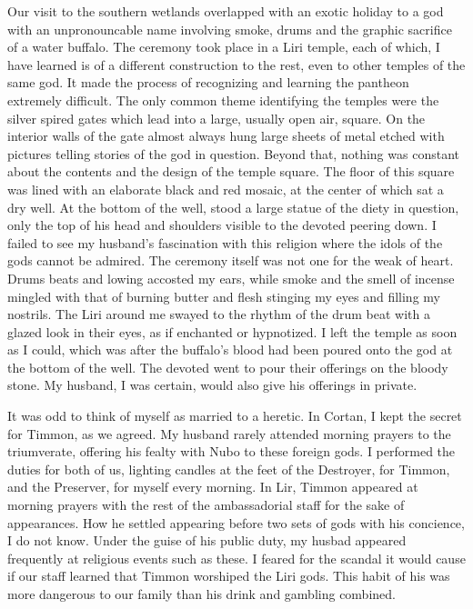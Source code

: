 \documentclass{article}
\begin{document}
Our visit to the southern wetlands overlapped with an exotic holiday to a god with an unpronouncable name involving smoke, drums and the graphic sacrifice of a water buffalo. The ceremony took place in a Liri temple, each of which, I have learned is of a different construction to the rest, even to other temples of the same god. It made the process of recognizing and learning the pantheon extremely difficult. The only common theme identifying the temples were the silver spired gates which lead into a large, usually open air, square. On the interior walls of the gate almost always hung large sheets of metal etched with pictures telling stories of the god in question. Beyond that, nothing was constant about the contents and the design of the temple square. The floor of this square was lined with an elaborate black and red mosaic, at the center of which sat a dry well. At the bottom of the well, stood a large statue of the diety in question, only the top of his head and shoulders visible to the devoted peering down. I failed to see my husband's fascination with this religion where the idols of the gods cannot be admired. The ceremony itself was not one for the weak of heart. Drums beats and lowing accosted my ears, while smoke and the smell of incense mingled with that of burning butter and flesh stinging my eyes and filling my nostrils. The Liri around me swayed to the rhythm of the drum beat with a glazed look in their eyes, as if enchanted or hypnotized. I left the temple as soon as I could, which was after the buffalo's blood had been poured onto the god at the bottom of the well. The devoted went to pour their offerings on the bloody stone. My husband, I was certain, would also give his offerings in private. 

It was odd to think of myself as married to a heretic. In Cortan, I kept the secret for Timmon, as we agreed. My husband rarely attended morning prayers to the triumverate, offering his fealty with Nubo to these foreign gods. I performed the duties for both of us, lighting candles at the feet of the Destroyer, for Timmon, and the Preserver, for myself every morning. In Lir, Timmon appeared at morning prayers with the rest of the ambassadorial staff for the sake of appearances. How he settled appearing before two sets of gods with his concience, I do not know. Under the guise of his public duty, my husbad appeared frequently at religious events such as these. I feared for the scandal it would cause if our staff learned that Timmon worshiped the Liri gods. This habit of his was more dangerous to our family than his drink and gambling combined.
\end{document}
